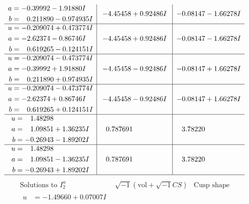 \documentclass[1p]{elsarticle_modified}
\theoremstyle{definition}
\newcommand{\I}{\sqrt{-1}}
\begin{document}
$$\begin{array}{c|c|c}
\begin{aligned}
a &= -0.39992 - 1.91880 I \\
b &= \phantom{-}0.211890 - 0.974935 I\end{aligned}
 & -4.45458 + 0.92486 I & -0.08147 - 1.66278 I \\ \hline\begin{aligned}
u &= -0.209074 + 0.473774 I \\
a &= -2.62374 - 0.86746 I \\
b &= \phantom{-}0.619265 - 0.124151 I\end{aligned}
 & -4.45458 + 0.92486 I & -0.08147 - 1.66278 I \\ \hline\begin{aligned}
u &= -0.209074 - 0.473774 I \\
a &= -0.39992 + 1.91880 I \\
b &= \phantom{-}0.211890 + 0.974935 I\end{aligned}
 & -4.45458 - 0.92486 I & -0.08147 + 1.66278 I \\ \hline\begin{aligned}
u &= -0.209074 - 0.473774 I \\
a &= -2.62374 + 0.86746 I \\
b &= \phantom{-}0.619265 + 0.124151 I\end{aligned}
 & -4.45458 - 0.92486 I & -0.08147 + 1.66278 I \\ \hline\begin{aligned}
u &= \phantom{-}1.48298\phantom{ +0.000000I} \\
a &= \phantom{-}1.09851 + 1.36235 I \\
b &= -0.26943 - 1.89202 I\end{aligned}
 & \phantom{-}0.787691\phantom{ +0.000000I} & \phantom{-}3.78220\phantom{ +0.000000I} \\ \hline\begin{aligned}
u &= \phantom{-}1.48298\phantom{ +0.000000I} \\
a &= \phantom{-}1.09851 - 1.36235 I \\
b &= -0.26943 + 1.89202 I\end{aligned}
 & \phantom{-}0.787691\phantom{ +0.000000I} & \phantom{-}3.78220\phantom{ +0.000000I}\\
 \hline 
 \end{array}$$\newpage$$\begin{array}{c|c|c}  
\text{Solutions to }I^u_{2}& \I (\text{vol} + \sqrt{-1}CS) & \text{Cusp shape}\\
 \hline 
\begin{aligned}
u &= -1.49660 + 0.07007 I \\

\end{aligned}
\end{array}$$
\end{document}
